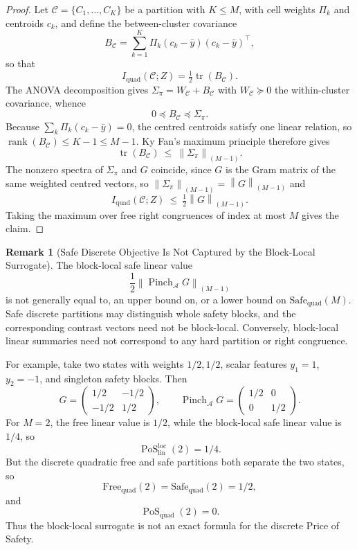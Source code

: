 \documentclass[12pt]{article}
\theoremstyle{definition}
\newtheorem{remark}[theorem]{Remark}
\DeclareMathOperator{\rank}{rank}
\DeclareMathOperator{\tr}{tr}
\DeclareMathOperator{\PoS}{PoS}
\newcommand{\EA}{\operatorname{Pinch}_{\mathcal A}}
\newcommand{\KyF}[2]{\left\|#1\right\|_{(#2)}}
\newcommand{\PoSlin}{\PoS_{\mathrm{lin}}^{\mathrm{loc}}}
\newcommand{\PoSquad}{\PoS_{\mathrm{quad}}}
\begin{document}
\begin{proof}
Let $\mathcal C=\{C_1,\dots,C_K\}$ be a partition with $K\le M$, with cell
weights $\Pi_k$ and centroids $c_k$, and define the between-cluster covariance
\[
B_{\mathcal C}
=
\sum_{k=1}^K\Pi_k(c_k-\bar y)(c_k-\bar y)^\top ,
\]
so that
\[
I_{\mathrm{quad}}(\mathcal C;Z)=\tfrac12\tr(B_{\mathcal C}).
\]
The ANOVA decomposition gives $\Sigma_\pi=W_{\mathcal C}+B_{\mathcal C}$ with
$W_{\mathcal C}\succeq0$ the within-cluster covariance, whence
\[
0\preceq B_{\mathcal C}\preceq\Sigma_\pi .
\]
Because $\sum_k\Pi_k(c_k-\bar y)=0$, the centred centroids satisfy one linear
relation, so $\rank(B_{\mathcal C})\le K-1\le M-1$.  Ky Fan's maximum
principle \cite{kyfan1951} therefore gives
\[
\tr(B_{\mathcal C})\ \le\ \KyF{\Sigma_\pi}{M-1}.
\]
The nonzero spectra of $\Sigma_\pi$ and $G$ coincide, since $G$ is the Gram
matrix of the same weighted centred vectors, so
$\KyF{\Sigma_\pi}{M-1}=\KyF{G}{M-1}$ and
\[
I_{\mathrm{quad}}(\mathcal C;Z)\ \le\ \tfrac12\KyF{G}{M-1}.
\]
Taking the maximum over free right congruences of index at most $M$ gives the
claim.
\end{proof}

\begin{remark}[Safe Discrete Objective Is Not Captured by the Block-Local Surrogate]
\label{rem:safe-discrete-not-captured}
The block-local safe linear value
\[
\frac12
\KyF{\EA G}{M-1}
\]
is not generally equal to, an upper bound on, or a lower bound on
$\mathrm{Safe}_{\mathrm{quad}}(M)$.  Safe discrete partitions may distinguish
whole safety blocks, and the corresponding contrast vectors need not be
block-local.  Conversely, block-local linear summaries need not correspond to
any hard partition or right congruence.

For example, take two states with weights $1/2,1/2$, scalar features
$y_1=1$, $y_2=-1$, and singleton safety blocks.  Then
\[
G=
\begin{pmatrix}
1/2 & -1/2\\
-1/2 & 1/2
\end{pmatrix},
\qquad
\EA G=
\begin{pmatrix}
1/2 & 0\\
0 & 1/2
\end{pmatrix}.
\]
For $M=2$, the free linear value is $1/2$, while the block-local safe linear
value is $1/4$, so
\[
\PoSlin(2)=1/4.
\]
But the discrete quadratic free and safe partitions both separate the two
states, so
\[
\mathrm{Free}_{\mathrm{quad}}(2)
=
\mathrm{Safe}_{\mathrm{quad}}(2)
=
1/2,
\]
and
\[
\PoSquad(2)=0.
\]
Thus the block-local surrogate is not an exact formula for the discrete Price
of Safety.
\end{remark}
\end{document}
